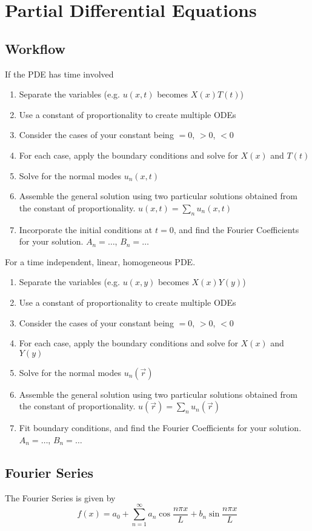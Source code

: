 \documentclass{article}
\begin{document}
\section{Partial Differential Equations}
\subsection{Workflow}
If the PDE has time involved
\begin{enumerate}
	\item Separate the variables (e.g. $u(x,t)$ becomes $X(x)T(t)$)
	\item Use a constant of proportionality to create multiple ODEs 
	\item Consider the cases of your constant being $= 0$, $> 0$, $< 0$
	\item For each case, apply the boundary conditions and solve for $X(x)$ and $T(t)$
	\item Solve for the normal modes $u_n(x,t)$
	\item Assemble the general solution using two particular solutions obtained from the constant of proportionality. $u(x,t) = \sum_{n} u_n (x,t)$
	\item Incorporate the initial conditions at $t=0$, and find the Fourier Coefficients for your solution. $A_n = \dots$, $B_n = \dots$
\end{enumerate}

For a time independent, linear, homogeneous PDE.
\begin{enumerate}
	\item Separate the variables (e.g. $u(x,y)$ becomes $X(x)Y(y)$)
	\item Use a constant of proportionality to create multiple ODEs 
	\item Consider the cases of your constant being $= 0$, $> 0$, $< 0$
	\item For each case, apply the boundary conditions and solve for $X(x)$ and $Y(y)$
	\item Solve for the normal modes $u_n(\vec{r})$
	\item Assemble the general solution using two particular solutions obtained from the constant of proportionality. $u(\vec{r}) = \sum_{n} u_n (\vec{r})$
	\item Fit boundary conditions, and find the Fourier Coefficients for your solution. $A_n = \dots$, $B_n = \dots$
\end{enumerate}
\subsection{Fourier Series}
The Fourier Series is given by 
$$
f(x) = a_0 + \sum_{n=1}^{\infty} a_n \cos\frac{n\pi x}{L} + b_n \sin\frac{n\pi x}{L} 
$$
\end{document}

